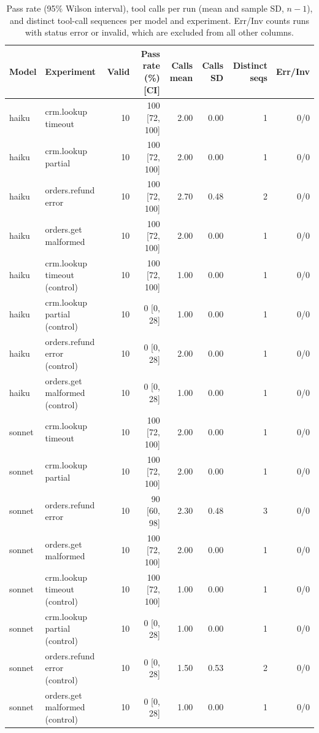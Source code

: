 \begin{table}[t]
\centering
\caption{Pass rate (95\% Wilson interval), tool calls per run (mean and sample SD, $n-1$), and distinct tool-call sequences per model and experiment. Err/Inv counts runs with status error or invalid, which are excluded from all other columns.}
\label{tab:rq1}
\begin{tabular}{llrrrrrr}
\hline
Model & Experiment & Valid & Pass rate (\%) [CI] & Calls mean & Calls SD & Distinct seqs & Err/Inv \\
\hline
haiku & crm.lookup timeout & 10 & 100 [72, 100] & 2.00 & 0.00 & 1 & 0/0 \\
haiku & crm.lookup partial & 10 & 100 [72, 100] & 2.00 & 0.00 & 1 & 0/0 \\
haiku & orders.refund error & 10 & 100 [72, 100] & 2.70 & 0.48 & 2 & 0/0 \\
haiku & orders.get malformed & 10 & 100 [72, 100] & 2.00 & 0.00 & 1 & 0/0 \\
haiku & crm.lookup timeout (control) & 10 & 100 [72, 100] & 1.00 & 0.00 & 1 & 0/0 \\
haiku & crm.lookup partial (control) & 10 & 0 [0, 28] & 1.00 & 0.00 & 1 & 0/0 \\
haiku & orders.refund error (control) & 10 & 0 [0, 28] & 2.00 & 0.00 & 1 & 0/0 \\
haiku & orders.get malformed (control) & 10 & 0 [0, 28] & 1.00 & 0.00 & 1 & 0/0 \\
sonnet & crm.lookup timeout & 10 & 100 [72, 100] & 2.00 & 0.00 & 1 & 0/0 \\
sonnet & crm.lookup partial & 10 & 100 [72, 100] & 2.00 & 0.00 & 1 & 0/0 \\
sonnet & orders.refund error & 10 & 90 [60, 98] & 2.30 & 0.48 & 3 & 0/0 \\
sonnet & orders.get malformed & 10 & 100 [72, 100] & 2.00 & 0.00 & 1 & 0/0 \\
sonnet & crm.lookup timeout (control) & 10 & 100 [72, 100] & 1.00 & 0.00 & 1 & 0/0 \\
sonnet & crm.lookup partial (control) & 10 & 0 [0, 28] & 1.00 & 0.00 & 1 & 0/0 \\
sonnet & orders.refund error (control) & 10 & 0 [0, 28] & 1.50 & 0.53 & 2 & 0/0 \\
sonnet & orders.get malformed (control) & 10 & 0 [0, 28] & 1.00 & 0.00 & 1 & 0/0 \\
\hline
\end{tabular}
\end{table}
